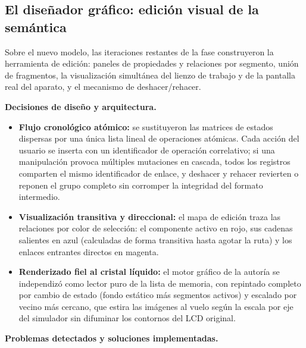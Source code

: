 \subsection{El diseñador gráfico: edición visual de la semántica}
\label{sec:F1Editor}

Sobre el nuevo modelo, las iteraciones restantes de la fase
construyeron la herramienta de edición: paneles de propiedades y
relaciones por segmento, unión de fragmentos, la visualización
simultánea del lienzo de trabajo y de la pantalla real del aparato, y
el mecanismo de deshacer/rehacer.

\textbf{Decisiones de diseño y arquitectura.}

\begin{itemize}
	\item \textbf{Flujo cronológico atómico:} se sustituyeron las matrices
	de estados dispersas por una única lista lineal de operaciones
	atómicas. Cada acción del usuario se inserta con un identificador de
	operación correlativo; si una manipulación provoca múltiples
	mutaciones en cascada, todos los registros comparten el mismo
	identificador de enlace, y deshacer y rehacer revierten o reponen el
	grupo completo sin corromper la integridad del formato intermedio.
	\item \textbf{Visualización transitiva y direccional:} el mapa de
	edición traza las relaciones por color de selección: el componente
	activo en rojo, sus cadenas salientes en azul (calculadas de forma
	transitiva hasta agotar la ruta) y los enlaces entrantes directos en
	magenta.
	\item \textbf{Renderizado fiel al cristal líquido:} el motor gráfico
	de la autoría se independizó como lector puro de la lista de memoria,
	con repintado completo por cambio de estado (fondo estático más
	segmentos activos) y escalado por vecino más cercano, que estira las
	imágenes al vuelo según la escala por eje del simulador sin difuminar
	los contornos del LCD original.
\end{itemize}

\textbf{Problemas detectados y soluciones implementadas.}

